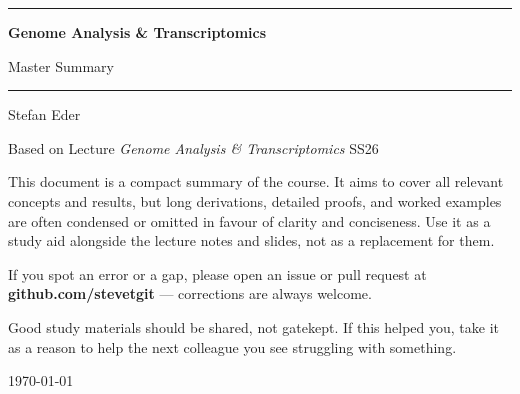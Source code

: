 \documentclass[11pt, oneside]{book}
\newcommand{\coursetitle}{Genome Analysis & Transcriptomics}
\newcommand{\documenttype}{Master Summary}
\newcommand{\authorname}{Stefan Eder}
\newcommand{\basedon}{Based on Lecture \emph{Genome Analysis & Transcriptomics} SS26}
\begin{document}
\frontmatter  %


\thispagestyle{empty}
\vspace*{1.8cm}

\begin{center}
  {\color{accent}\rule{\linewidth}{1.8pt}}
  \vspace{0.65cm}

  {\fontsize{28}{34}\selectfont\bfseries\color{accent}\coursetitle\par}
  \vspace{0.25cm}
  {\large\color{gray!80!black}\documenttype\par}

  \vspace{0.55cm}
  {\color{accent!35}\rule{\linewidth}{0.5pt}}
  \vspace{0.55cm}

  {\large\authorname\par}
  \vspace{0.2cm}
  {\small\color{gray!70}\basedon\par}
\end{center}

\vspace{1.6cm}

\begin{center}
\begin{minipage}{0.84\textwidth}
  \small\color{gray!80!black}
  This document is a compact summary of the course.
  It aims to cover all relevant concepts and results, but long derivations,
  detailed proofs, and worked examples are often condensed or omitted in
  favour of clarity and conciseness.
  Use it as a study aid alongside the lecture notes and slides, not as a
  replacement for them.

  \medskip
  If you spot an error or a gap, please open an issue or pull request at
  \textbf{github.com/stevetgit} --- corrections are always welcome.

  \medskip
  \color{gray!60!black}
  Good study materials should be shared, not gatekept.
  If this helped you, take it as a reason to help the next colleague you see struggling with something.
\end{minipage}
\end{center}

\vfill
{\centering\small\color{gray!65} \today\par}
\clearpage
\end{document}
